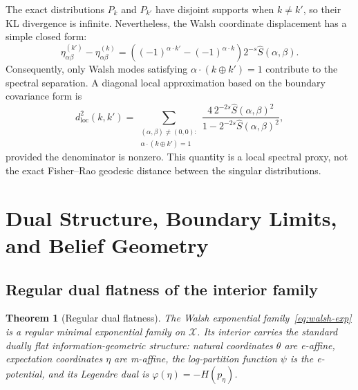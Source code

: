 \documentclass[referee,lineno,pdflatex,sn-mathphys-num]{sn-jnl}
\theoremstyle{thmstylethree}
\theoremstyle{thmstyletwo}
\theoremstyle{thmstyleone}
\newtheorem{theorem}{Theorem}[section]
\begin{document}
The exact distributions $P_k$ and $P_{k'}$ have disjoint supports when
$k\neq k'$, so their KL divergence is infinite.  Nevertheless, the Walsh
coordinate displacement has a simple closed form:
\begin{equation}\label{eq:eta-displacement}
  \eta^{(k')}_{\alpha\beta}-\eta^{(k)}_{\alpha\beta}
  =\left((-1)^{\alpha\cdot k'}-(-1)^{\alpha\cdot k}\right)2^{-s}\widehat S(\alpha,\beta).
\end{equation}
Consequently, only Walsh modes satisfying $\alpha\cdot(k\oplus k')=1$ contribute
to the spectral separation.  A diagonal local approximation based on the
boundary covariance form is
\begin{equation}\label{eq:fr-local}
  d_{\mathrm{loc}}^2(k,k')
  =\sum_{\substack{(\alpha,\beta)\neq(0,0):\\
  \alpha\cdot(k\oplus k')=1}}
  \frac{4\,2^{-2s}\widehat S(\alpha,\beta)^2}
  {1-2^{-2s}\widehat S(\alpha,\beta)^2},
\end{equation}
provided the denominator is nonzero.  This quantity is a local spectral proxy,
not the exact Fisher--Rao geodesic distance between the singular distributions.

\section{Dual Structure, Boundary Limits, and Belief Geometry}\label{sec:dual}

\subsection{Regular dual flatness of the interior family}\label{subsec:dual-flat}

\begin{theorem}[Regular dual flatness]\label{thm:dual-flat-walsh}
The Walsh exponential family~\eqref{eq:walsh-exp} is a regular minimal
exponential family on $\mathcal X$.  Its interior carries the standard dually
flat information-geometric structure: natural coordinates $\theta$ are
e-affine, expectation coordinates $\eta$ are m-affine, the log-partition
function $\psi$ is the e-potential, and its Legendre dual is
$\varphi(\eta)=-H(p_\eta)$.
\end{theorem}
\end{document}
